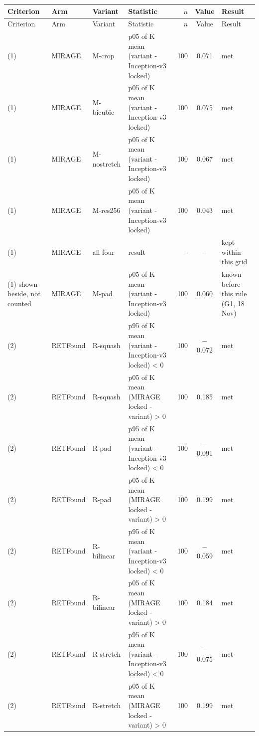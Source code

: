 \begin{longtable}{@{}p{1.6cm}lp{1.5cm}p{4.2cm}rcp{5.2cm}@{}}
\toprule
Criterion & Arm & Variant & Statistic & $n$ & Value & Result \\
\midrule
\endfirsthead
\toprule
Criterion & Arm & Variant & Statistic & $n$ & Value & Result \\
\midrule
\endhead
\bottomrule
\endfoot
\bottomrule
\endlastfoot
(1) & MIRAGE & M-crop & p05 of K mean (variant - Inception-v3 locked) & 100 & 0.071 & met \\
(1) & MIRAGE & M-bicubic & p05 of K mean (variant - Inception-v3 locked) & 100 & 0.075 & met \\
(1) & MIRAGE & M-nostretch & p05 of K mean (variant - Inception-v3 locked) & 100 & 0.067 & met \\
(1) & MIRAGE & M-res256 & p05 of K mean (variant - Inception-v3 locked) & 100 & 0.043 & met \\
(1) & MIRAGE & all four & result & -- & -- & kept within this grid \\
(1) shown beside, not counted & MIRAGE & M-pad & p05 of K mean (variant - Inception-v3 locked) & 100 & 0.060 & known before this rule (G1, 18 Nov) \\
(2) & RETFound & R-squash & p95 of K mean (variant - Inception-v3 locked) < 0 & 100 & $-$0.072 & met \\
(2) & RETFound & R-squash & p05 of K mean (MIRAGE locked - variant) > 0 & 100 & 0.185 & met \\
(2) & RETFound & R-pad & p95 of K mean (variant - Inception-v3 locked) < 0 & 100 & $-$0.091 & met \\
(2) & RETFound & R-pad & p05 of K mean (MIRAGE locked - variant) > 0 & 100 & 0.199 & met \\
(2) & RETFound & R-bilinear & p95 of K mean (variant - Inception-v3 locked) < 0 & 100 & $-$0.059 & met \\
(2) & RETFound & R-bilinear & p05 of K mean (MIRAGE locked - variant) > 0 & 100 & 0.184 & met \\
(2) & RETFound & R-stretch & p95 of K mean (variant - Inception-v3 locked) < 0 & 100 & $-$0.075 & met \\
(2) & RETFound & R-stretch & p05 of K mean (MIRAGE locked - variant) > 0 & 100 & 0.199 & met \\

\end{longtable}
